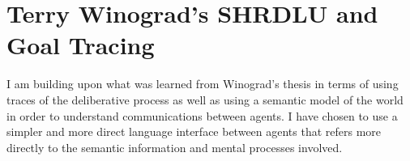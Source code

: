 \section{Terry Winograd's SHRDLU and Goal Tracing}

I am building upon what was learned from Winograd's thesis
\citep{winograd:1970} in terms of using traces of the deliberative
process as well as using a semantic model of the world in order to
understand communications between agents.  I have chosen to use a
simpler and more direct language interface between agents that refers
more directly to the semantic information and mental processes
involved.

